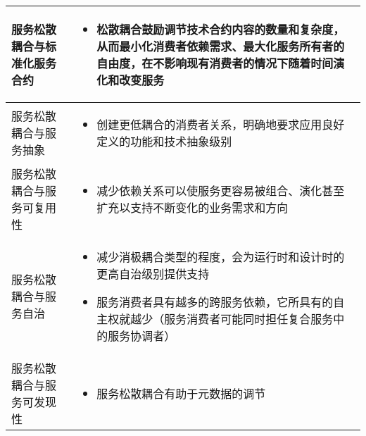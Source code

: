\begin{longtable}{|m{3cm}<{\centering}|m{12cm}|}
    \hline
    服务松散耦合与标准化服务合约
    & 
    \vspace{-1.3em}
    \begin{itemize}[leftmargin=1.5em,itemsep=-3pt,topsep=-3pt]
        \item 松散耦合鼓励调节技术合约内容的数量和复杂度，从而最小化消费者依赖需求、最大化服务所有者的自由度，在不影响现有消费者的情况下随着时间演化和改变服务
    \vspace{-1.5em}
    \end{itemize}  
    \\ \hline
    服务松散耦合与服务抽象
    & 
    \vspace{-1.3em}
    \begin{itemize}[leftmargin=1.5em,itemsep=-3pt,topsep=-3pt]
        \item 创建更低耦合的消费者关系，明确地要求应用良好定义的功能和技术抽象级别
    \vspace{-1.5em}
    \end{itemize}  
    \\ \hline
    服务松散耦合与服务可复用性
    & 
    \vspace{-1.3em}
    \begin{itemize}[leftmargin=1.5em,itemsep=-3pt,topsep=-3pt]
        \item 减少依赖关系可以使服务更容易被组合、演化甚至扩充以支持不断变化的业务需求和方向
    \vspace{-1.5em}
    \end{itemize}  
    \\ \hline
    服务松散耦合与服务自治
    & 
    \vspace{-1.3em}
    \begin{itemize}[leftmargin=1.5em,itemsep=-3pt,topsep=-3pt]
        \item 减少消极耦合类型的程度，会为运行时和设计时的更高自治级别提供支持
        \item 服务消费者具有越多的跨服务依赖，它所具有的自主权就越少（服务消费者可能同时担任复合服务中的服务协调者）
    \vspace{-1.5em}
    \end{itemize}  
    \\ \hline
    服务松散耦合与服务可发现性
    & 
    \vspace{-1.3em}
    \begin{itemize}[leftmargin=1.5em,itemsep=-3pt,topsep=-3pt]
        \item 服务松散耦合有助于元数据的调节

\end{itemize}
\end{longtable}
